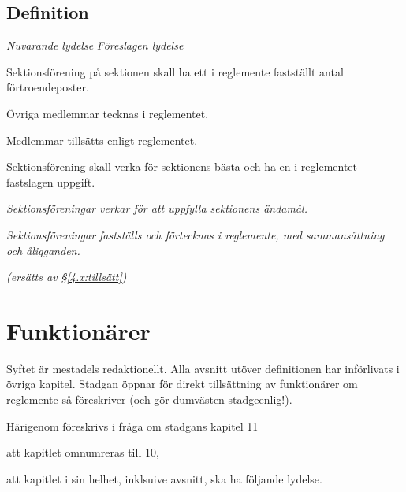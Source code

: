 \documentclass{article}
\newenvironment{lydelse}
    {\begin{paracol}{2}%
        \emph{Nuvarande lydelse}%
        \switchcolumn%
        \emph{Föreslagen lydelse}%
    \end{paracol}%
    \begin{enumerate}[label=\thesubsection.\arabic*]%
    \begin{paracol}{2}%
    }{\end{paracol}\end{enumerate}}
\begin{document}
\subsection{Definition}
\begin{lydelse}
\setcounter{section}{10}
\setcounter{subsection}{1}
  \item Sektionsförening på sektionen skall ha ett i reglemente fastställt antal förtroendeposter.
  \item Övriga medlemmar tecknas i reglementet.
  \item Medlemmar tillsätts enligt reglementet.
  \item Sektionsförening skall verka för sektionens bästa och ha en i reglementet fastslagen uppgift.
\switchcolumn
  \setcounter{section}{9}
  \item \emph{Sektionsföreningar verkar för att uppfylla sektionens ändamål.}
  \item \emph{Sektionsföreningar fastställs och förtecknas i reglemente, med sammansättning och åligganden.}
  \item[] \emph{(ersätts av \S\ref{4.x:tillsätt})}
\end{lydelse}
\setcounter{section}{9}

\section{Funktionärer}
Syftet är mestadels redaktionellt.
Alla avsnitt utöver definitionen har införlivats i övriga kapitel.
Stadgan öppnar för direkt tillsättning av funktionärer om reglemente så föreskriver (och gör dumvästen stadgeenlig!).

Härigenom föreskrivs i fråga om stadgans kapitel 11
\begin{dels}
\item att kapitlet omnumreras till 10,
\item att kapitlet i sin helhet, inklsuive avsnitt, ska ha följande lydelse.
\end{dels}
\end{document}
